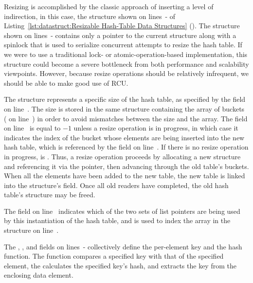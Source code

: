 \begin{lineref}
Resizing is accomplished by the classic approach of inserting a level
of indirection, in this case, the  structure shown on
lines~- of
Listing~\ref{lst:datastruct:Resizable Hash-Table Data Structures}
().
The  structure shown on
lines~- contains only a
pointer to the current  structure along with a spinlock that
is used to serialize concurrent attempts to resize the hash table.
If we were to use a traditional lock- or atomic-operation-based
implementation, this  structure could become a severe bottleneck
from both performance and scalability viewpoints.
However, because resize operations should be relatively infrequent,
we should be able to make good use of RCU.

The  structure represents a specific size of the hash table,
as specified by the  field on line~.
The size is stored in the same structure containing the array of
buckets ( on
line~) in order to avoid mismatches between
the size and the array.
The  field on
line~ is equal to $-1$ unless a resize
operation
is in progress, in which case it indicates the index of the bucket whose
elements are being inserted into the new hash table, which is referenced
by the  field on line~.
If there is no resize operation in progress,  is .
Thus, a resize operation proceeds by allocating a new  structure
and referencing it via the  pointer, then advancing
 through the old table's buckets.
When all the elements have been added to the new table, the new
table is linked into the  structure's  field.
Once all old readers have completed, the old hash table's  structure
may be freed.

The  field on
line~ indicates which of the two sets of
list pointers are being used by this instantiation of the hash table,
and is used to index the  array in the 
structure on line~.

The , , and  fields on
lines~-
collectively define the per-element key and the hash function.
The  function compares a specified key with that of
the specified element,
the  calculates the specified key's hash,
and  extracts the key from the enclosing data
element.


\end{lineref}
